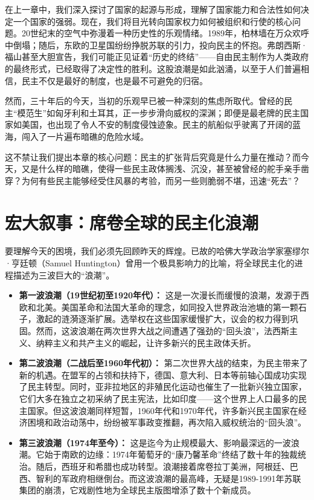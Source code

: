 \documentclass[a5paper, 11pt, openany]{ctexbook}
\begin{document}
在上一章中，我们深入探讨了国家的起源与形成，理解了国家能力和合法性如何决定一个国家的强弱。现在，我们将目光转向国家权力如何被组织和行使的核心问题。20世纪末的空气中弥漫着一种历史性的乐观情绪。1989年，柏林墙在万众欢呼中倒塌；随后，东欧的卫星国纷纷挣脱苏联的引力，投向民主的怀抱。弗朗西斯·福山甚至大胆宣告，我们可能正见证着“历史的终结”——自由民主制作为人类政府的最终形式，已经取得了决定性的胜利。这股浪潮是如此汹涌，以至于人们普遍相信，民主不仅是最好的制度，也是最不可避免的归宿。

然而，三十年后的今天，当初的乐观早已被一种深刻的焦虑所取代。曾经的民主“模范生”如匈牙利和土耳其，正一步步滑向威权的深渊；即便是最老牌的民主国家如美国，也出现了令人不安的制度侵蚀迹象。民主的航船似乎驶离了开阔的蓝海，闯入了一片遍布暗礁的危险水域。

这不禁让我们提出本章的核心问题：民主的扩张背后究竟是什么力量在推动？而今天，又是什么样的暗礁，使得一些民主政体搁浅、沉没，甚至被曾经的舵手亲手凿穿？为何有些民主能够经受住风暴的考验，而另一些则脆弱不堪，迅速“死去”？

\section{宏大叙事：席卷全球的民主化浪潮}

要理解今天的困境，我们必须先回顾昨天的辉煌。已故的哈佛大学政治学家塞缪尔·亨廷顿（Samuel Huntington）曾用一个极具影响力的比喻，将全球民主化的进程描述为三波巨大的“浪潮”。

\begin{itemize}
    \item \textbf{第一波浪潮（19世纪初至1920年代）：} 这是一次漫长而缓慢的浪潮，发源于西欧和北美。美国革命和法国大革命的理念，如同投入世界政治池塘的第一颗石子，激起的涟漪逐渐扩展。选举权在这些国家缓慢扩大，议会的权力得到巩固。然而，这波浪潮在两次世界大战之间遭遇了强劲的“回头浪”，法西斯主义、纳粹主义和共产主义的崛起，让许多新兴的民主政体夭折。
    \item \textbf{第二波浪潮（二战后至1960年代初）：} 第二次世界大战的结束，为民主带来了新的机遇。在盟军的占领和扶持下，德国、意大利、日本等前轴心国成功实现了民主转型。同时，亚非拉地区的非殖民化运动也催生了一批新兴独立国家，它们大多在独立之初采纳了民主宪法，比如印度——这个世界上人口最多的民主国家。但这波浪潮同样短暂，1960年代和1970年代，许多新兴民主国家在经济困境和政治动荡中，纷纷被军事政变推翻，再次陷入威权统治的“回头浪”。
    \item \textbf{第三波浪潮（1974年至今）：} 这是迄今为止规模最大、影响最深远的一波浪潮。它始于南欧的边缘：1974年葡萄牙的“康乃馨革命”终结了数十年的独裁统治。随后，西班牙和希腊也成功转型。浪潮接着席卷拉丁美洲，阿根廷、巴西、智利的军政府相继倒台。而这波浪潮的最高峰，无疑是1989-1991年苏联集团的崩溃，它戏剧性地为全球民主版图增添了数十个新成员。
\end{itemize}
\end{document}
